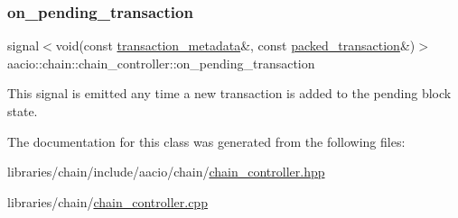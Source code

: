 \subsubsection{\texorpdfstring{on\+\_\+pending\+\_\+transaction}{on\_pending\_transaction}}
{\footnotesize\ttfamily signal$<$void(const \mbox{\hyperlink{classaacio_1_1chain_1_1transaction__metadata}{transaction\+\_\+metadata}}\&, const \mbox{\hyperlink{structaacio_1_1chain_1_1packed__transaction}{packed\+\_\+transaction}}\&)$>$ aacio\+::chain\+::chain\+\_\+controller\+::on\+\_\+pending\+\_\+transaction}

This signal is emitted any time a new transaction is added to the pending block state. 

The documentation for this class was generated from the following files\+:\begin{DoxyCompactItemize}
\item 
libraries/chain/include/aacio/chain/\mbox{\hyperlink{chain__controller_8hpp}{chain\+\_\+controller.\+hpp}}\item 
libraries/chain/\mbox{\hyperlink{chain__controller_8cpp}{chain\+\_\+controller.\+cpp}}\end{DoxyCompactItemize}
